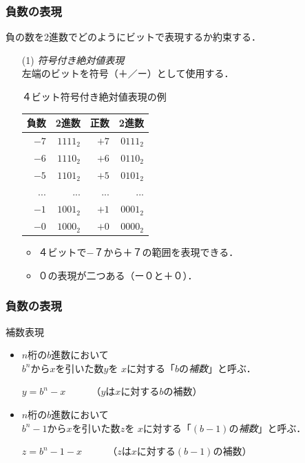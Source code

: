 \documentclass[handout]{beamer}        %
\begin{document}
\begin{frame}
  \frametitle{負数の表現}
負の数を2進数でどのようにビットで表現するか約束する．

\begin{enumerate}
\item[(1)] \emph{符号付き絶対値表現}\\
  左端のビットを符号（＋／ー）として使用する．
  \begin{itembox}[l]{４ビット符号付き絶対値表現の例}
    \begin{minipage}{0.5\columnwidth}
      \begin{tabular}{ r | r || r | r }
        \hline
        \hline
        負数 & 2進数    & 正数 & 2進数 \\
        \hline
        $-7$ & $1111_2$ & $+7$ & $0111_2$ \\
        $-6$ & $1110_2$ & $+6$ & $0110_2$ \\
        $-5$ & $1101_2$ & $+5$ & $0101_2$ \\
        ...  & ...      & ...  & ... \\
        $-1$ & $1001_2$ & $+1$ & $0001_2$ \\
        $-0$ & $1000_2$ & $+0$ & $0000_2$ \\
      \end{tabular}
    \end{minipage}
    \begin{minipage}{0.5\columnwidth}
      \begin{itemize}
      \item ４ビットで−７から＋７の範囲を表現できる．
      \item ０の表現が二つある（ー０と＋０）．
      \end{itemize}
    \end{minipage}
  \end{itembox}
\end{enumerate}
\end{frame}

\begin{frame}
  \frametitle{負数の表現}
  \begin{itembox}[l]{補数表現}
    \begin{itemize}
    \item $n$桁の$b$進数において \\ $b^n$から$x$を引いた数$y$を
      $x$に対する「$b$の\emph{補数}」と呼ぶ．
      \centerline{$y = b^n -x$ ~~~~  （$y$は$x$に対する$b$の補数）}
    \item $n$桁の$b$進数において \\$b^n-1$から$x$を引いた数$z$を
      $x$に対する「$(b-1)$の\emph{補数}」と呼ぶ．
      \centerline{$z = b^n - 1 -x$ ~~~~ （$z$は$x$に対する$(b-1)$の補数）}
    \end{itemize}
  \end{itembox}
\end{frame}
\end{document}
